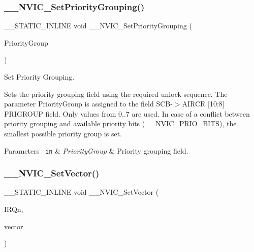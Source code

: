 \subsubsection{\texorpdfstring{\_\_NVIC\_SetPriorityGrouping()}{\_\_NVIC\_SetPriorityGrouping()}}
{\footnotesize\ttfamily \+\_\+\+\_\+\+S\+T\+A\+T\+I\+C\+\_\+\+I\+N\+L\+I\+NE void \+\_\+\+\_\+\+N\+V\+I\+C\+\_\+\+Set\+Priority\+Grouping (\begin{DoxyParamCaption}\item[{uint32\+\_\+t}]{Priority\+Group }\end{DoxyParamCaption})}



Set Priority Grouping. 

Sets the priority grouping field using the required unlock sequence. The parameter Priority\+Group is assigned to the field S\+C\+B-\/$>$A\+I\+R\+CR \mbox{[}10\+:8\mbox{]} P\+R\+I\+G\+R\+O\+UP field. Only values from 0..7 are used. In case of a conflict between priority grouping and available priority bits (\+\_\+\+\_\+\+N\+V\+I\+C\+\_\+\+P\+R\+I\+O\+\_\+\+B\+I\+TS), the smallest possible priority group is set. 
\begin{DoxyParams}[1]{Parameters}
\mbox{\texttt{ in}}  & {\em Priority\+Group} & Priority grouping field. \\
\hline
\end{DoxyParams}
\mbox{\label{group___c_m_s_i_s___core___n_v_i_c_functions_ga0df355460bc1783d58f9d72ee4884208}} 
\subsubsection{\texorpdfstring{\_\_NVIC\_SetVector()}{\_\_NVIC\_SetVector()}}
{\footnotesize\ttfamily \+\_\+\+\_\+\+S\+T\+A\+T\+I\+C\+\_\+\+I\+N\+L\+I\+NE void \+\_\+\+\_\+\+N\+V\+I\+C\+\_\+\+Set\+Vector (\begin{DoxyParamCaption}\item[{\mbox{\hyperlink{group___configuration__section__for___c_m_s_i_s_ga7e1129cd8a196f4284d41db3e82ad5c8}{I\+R\+Qn\+\_\+\+Type}}}]{I\+R\+Qn,  }\item[{uint32\+\_\+t}]{vector }\end{DoxyParamCaption})}



